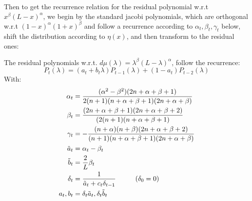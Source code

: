 \documentclass{article}
\begin{document}
\label{jacobi recurrence}
Then to get  the recurrence relation for the residual polynomial w.r.t $x^\beta(L-x)^\alpha$, we begin by the standard jacobi polynomials, which are orthogonal w.r.t $(1-x)^\alpha(1+x)^\beta$ and follow a recurrence according to $\alpha_t,\beta_t,\gamma_t$ below, shift the distribution according to $\eta(x)$, and then transform to the residual ones:
\begin{prop}
The residual polynomials w.r.t. $d\mu(\lambda)=\lambda^\beta(L-\lambda)^\alpha$, follow the recurrence:
\begin{equation*}
    P_t(\lambda)=(a_t+b_t\lambda)P_{t-1}(\lambda)+(1-a_t)P_{t-2}(\lambda)
\end{equation*}
With:
\begin{align}
    \alpha_t&=\frac{(\alpha^2-\beta^2)(2n+\alpha+\beta+1)}{
            2(n+1)(n+\alpha+\beta+1)(2n+\alpha+\beta)} \\
        \beta_t&=\frac{(2n+\alpha+\beta+1)(2n+\alpha+\beta+2)}{
            (2(n+1)(n+\alpha+\beta+1)} \\
        \gamma_t&=-\frac{(n+\alpha)(n+\beta)(2n+\alpha+\beta+2)}{
            (n+1)(n+\alpha+\beta+1)(2n+\alpha+\beta)} \\
        \tilde{a}_t&=\alpha_t-\beta_t \\
        \tilde{b}_t&=\frac{2}{L}\beta_t \\
        \delta_t&=\frac{1}{\tilde{a}_t+c_t\delta_{t-1}}  \hspace{1 cm} (\delta_0=0)\\
        a_t,b_t&=\delta_t\tilde{a}_t,\delta_t\tilde{b}_t
\end{align}


\end{prop}
\end{document}
